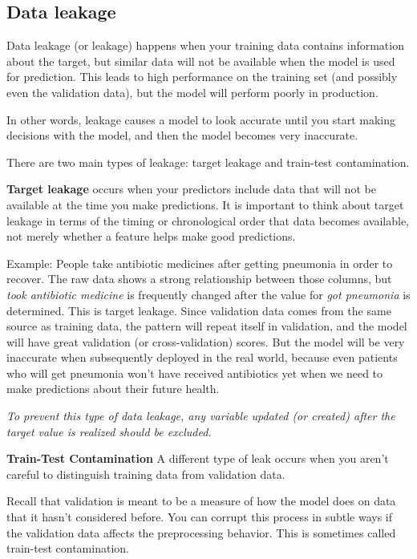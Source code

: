 \documentclass[12pt]{report}
\begin{document}
\subsection{Data leakage}

Data leakage (or leakage) happens when your training data contains information about the target, but similar data will not be available when the model is used for prediction. This leads to high performance on the training set (and possibly even the validation data), but the model will perform poorly in production.

In other words, leakage causes a model to look accurate until you start making decisions with the model, and then the model becomes very inaccurate.

There are two main types of leakage: target leakage and train-test contamination.

\textbf{Target leakage} occurs when your predictors include data that will not be available at the time you make predictions. It is important to think about target leakage in terms of the timing or chronological order that data becomes available, not merely whether a feature helps make good predictions.

Example: People take antibiotic medicines after getting pneumonia in order to recover. The raw data shows a strong  relationship between those columns, but \textit{took antibiotic medicine} is frequently changed after the value for \textit{got pneumonia} is determined. This is target leakage. Since validation data comes from the same source as training data, the pattern will repeat itself in validation, and the model will have great validation (or cross-validation) scores. But the model will be very inaccurate when subsequently deployed in the real world, because even patients who will get pneumonia won't have received antibiotics yet when we need to make predictions about their future health.

\textit{To prevent this type of data leakage, any variable updated (or created) after the target value is realized should be excluded.}

\textbf{Train-Test Contamination}
A different type of leak occurs when you aren't careful to distinguish training data from validation data.

Recall that validation is meant to be a measure of how the model does on data that it hasn't considered before. You can corrupt this process in subtle ways if the validation data affects the preprocessing behavior. This is sometimes called train-test contamination.
\end{document}
